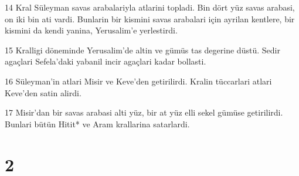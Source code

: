 \par 14 Kral Süleyman savas arabalariyla atlarini topladi. Bin dört yüz savas arabasi, on iki bin ati vardi. Bunlarin bir kismini savas arabalari için ayrilan kentlere, bir kismini da kendi yanina, Yerusalim'e yerlestirdi.
\par 15 Kralligi döneminde Yerusalim'de altin ve gümüs tas degerine düstü. Sedir agaçlari Sefela'daki yabanil incir agaçlari kadar bollasti.
\par 16 Süleyman'in atlari Misir ve Keve'den getirilirdi. Kralin tüccarlari atlari Keve'den satin alirdi.
\par 17 Misir'dan bir savas arabasi alti yüz, bir at yüz elli sekel gümüse getirilirdi. Bunlari bütün Hitit* ve Aram krallarina satarlardi.

\chapter{2}

